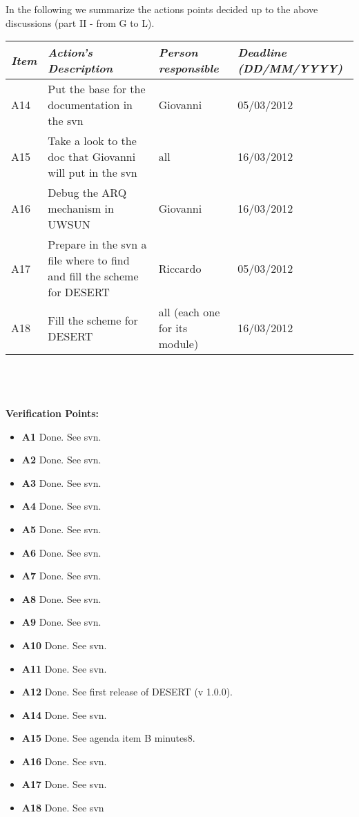 \documentclass[11pt,journal,draftclsnofoot,onecolumn,twoside,letterpaper]{IEEEtran}
\theoremstyle{definition} \newtheorem{definition}[]{Definition}
\theoremstyle{theorem} \newtheorem{theorem}[]{Theorem}
\begin{document}
In the following we summarize the actions points decided up to the above discussions (part II - from G to L). 

\begin{tabular}{|p{}|p{}|p{}|p{}|}
\hline
{\it Item} & {\it Action's Description} & {\it Person responsible} & {\it Deadline (DD/MM/YYYY)}\\
\hline
A14 & Put the base for the documentation in the svn & Giovanni & 05/03/2012\\ 
A15 & Take a look to the doc that Giovanni will put in the svn & all & 16/03/2012\\ 
A16 & Debug the ARQ mechanism in UWSUN & Giovanni & 16/03/2012\\ 
A17 & Prepare in the svn a file where to find and fill the scheme for DESERT & Riccardo & 05/03/2012\\
A18 & Fill the scheme for DESERT & all (each one for its module) & 16/03/2012\\
\hline
\end{tabular}
\ \\

\ \\
\ \\
{\bf Verification Points:}
\begin{itemize}
 \item {\bf A1} Done. See svn.  
 \item {\bf A2} Done. See svn. 
 \item {\bf A3} Done. See svn.
 \item {\bf A4} Done. See svn.
 \item {\bf A5} Done. See svn.
 \item {\bf A6} Done. See svn. 
 \item {\bf A7} Done. See svn. 
 \item {\bf A8} Done. See svn.
 \item {\bf A9} Done. See svn.
 \item {\bf A10} Done. See svn. 
 \item {\bf A11} Done. See svn.
 \item {\bf A12} Done. See first release of DESERT (v 1.0.0).
 \item {\bf A14} Done. See svn.
 \item {\bf A15} Done. See agenda item B minutes8.
 \item {\bf A16} Done. See svn.
 \item {\bf A17} Done. See svn.
 \item {\bf A18} Done. See svn
\end{itemize}
\end{document}
